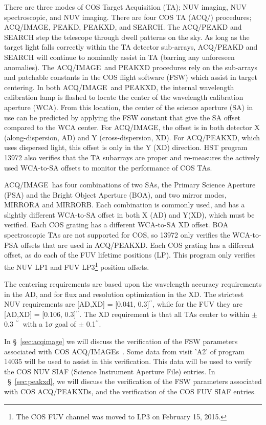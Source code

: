 \documentclass[12pt]{reportj}
\def\arcsec{\hbox{$^{\prime\prime}$}}
\newcommand*{\myfont}{\fontfamily{rm}\selectfont}
\def\acqimageno{{\myfont ACQ/IMAGE}\rm}
\def\acqimage{{\myfont ACQ/IMAGE}\rm~}
\def\acqimages{{\myfont ACQ/IMAGE{\rm s}}\rm~}
\begin{document}
There are three modes of COS Target Acquisition (TA); NUV imaging, NUV spectroscopic, and NUV imaging.
There are four COS TA (ACQ/) procedures; \acqimageno, PEAKD, PEAKXD, and SEARCH. The ACQ/PEAKD and SEARCH
step the telescope through dwell patterns on the sky. As long as the target light falls correctly within
the TA detector sub-arrays, ACQ/PEAKD and SEARCH will continue to nominally assist in TA (barring any
unforeseen anomalies). The \acqimage and PEAKXD procedures rely on the sub-arrays and patchable constants
in the COS flight software (FSW) which assist in target centering. In both \acqimage and PEAKXD, the internal
wavelength calibration lamp is flashed to locate the center of the wavelength calibration aperture (WCA). From this location, the center of the
science aperture (SA) in use can be predicted by applying the FSW constant that give the SA offset compared to the WCA center. For \acqimageno,
the offset is in both detector X (along-dispersion, AD) and Y (cross-dispersion, XD). For ACQ/PEAKXD, which
uses dispersed light, this offset is only in the Y (XD) direction. HST program 13972 also verifies that the TA subarrays
are proper and re-measures the actively used WCA-to-SA offsets to monitor the performance of COS TAs.

\acqimage has four combinations of two SAs, the Primary Science Aperture (PSA) and the Bright
Object Aperture (BOA), and two mirror modes, MIRRORA and MIRRORB. Each combination is commonly used, and has a slightly different
WCA-to-SA offset in both X (AD) and Y(XD), which must be verified. Each COS grating has a different WCA-to-SA XD offset.
BOA spectroscopic TAs are not supported for COS, so 13972 only verifies the WCA-to-PSA offsets that are used in ACQ/PEAKXD.
Each COS grating has a different offset, as do each of the FUV lifetime positions (LP). This program only verifies the NUV LP1
and FUV LP3\footnote{The COS FUV channel was moved to LP3 on February 15, 2015.} position offsets.

The centering requirements are based upon the wavelength accuracy requirements in the AD, and for flux and resolution optimization
in the XD. The strictest NUV requirements are [AD,XD] = [0.041, 0.3]\arcsec, while for the FUV they are [AD,XD] = [0.106, 0.3]\arcsec. The XD
requirement is that all TAs center to within $\pm$ 0.3 \arcsec\ with a 1$\sigma$ goal of $\pm$ 0.1\arcsec.

In \S~\ref{sec:acqimage} we will discuss the verification of the FSW parameters associated with COS \acqimages.
Some data from visit 'A2' of program 14035 will be used to assist in this verification. This data will be used to verify
the COS NUV SIAF (Science Instrument Aperture File) entries. In ~\S~\ref{sec:peakxd},
we will discuss the verification of the FSW parameters associated with COS ACQ/PEAKXDs, and the verification of the
COS FUV SIAF entries.
\end{document}
